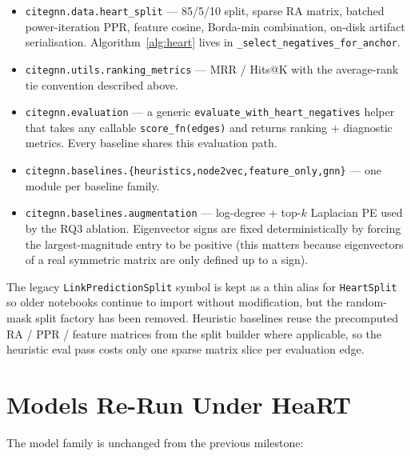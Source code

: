 \documentclass[10pt,a4paper]{article}
\begin{document}
\begin{itemize}
\item \texttt{citegnn.data.heart\_split} --- 85/5/10 split, sparse RA
  matrix, batched power-iteration PPR, feature cosine, Borda-min
  combination, on-disk artifact serialisation. Algorithm~\ref{alg:heart}
  lives in \texttt{\_select\_negatives\_for\_anchor}.
\item \texttt{citegnn.utils.ranking\_metrics} --- MRR / Hits@K with the
  average-rank tie convention described above.
\item \texttt{citegnn.evaluation} --- a generic
  \texttt{evaluate\_with\_heart\_negatives} helper that takes any
  callable \texttt{score\_fn(edges)} and returns ranking + diagnostic
  metrics. Every baseline shares this evaluation path.
\item \texttt{citegnn.baselines.\{heuristics,node2vec,feature\_only,gnn\}}
  --- one module per baseline family.
\item \texttt{citegnn.baselines.augmentation} --- log-degree + top-$k$
  Laplacian PE used by the RQ3 ablation. Eigenvector signs are fixed
  deterministically by forcing the largest-magnitude entry to be
  positive (this matters because eigenvectors of a real symmetric
  matrix are only defined up to a sign).
\end{itemize}

The legacy \texttt{LinkPredictionSplit} symbol is kept as a thin alias
for \texttt{HeartSplit} so older notebooks continue to import without
modification, but the random-mask split factory has been removed.
Heuristic baselines reuse the precomputed RA / PPR / feature matrices
from the split builder where applicable, so the heuristic eval pass
costs only one sparse matrix slice per evaluation edge.

\section{Models Re-Run Under HeaRT}
The model family is unchanged from the previous milestone:
\end{document}
